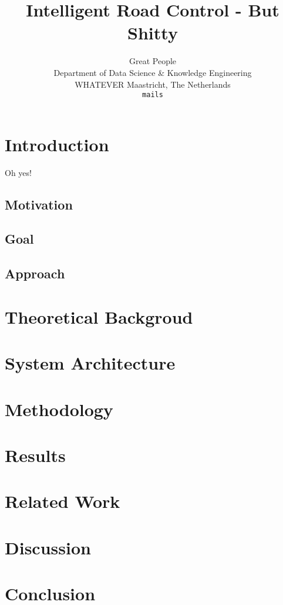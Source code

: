 \documentclass[10pt]{article}
\title{Intelligent Road Control - But Shitty}
\author{Great People \\
	Department of Data Science \& Knowledge Engineering\\
	WHATEVER Maastricht, The Netherlands\\
	{\tt mails}
  }
\begin{document}
\maketitle

\begin{abstract}
	\lipsum[1]
\end{abstract}

\section{Introduction}
Oh yes! \citep{god0000his}
\lipsum[3]

\subsection{Motivation}
\lipsum[2]

\subsection{Goal}
\lipsum[2]

\subsection{Approach}
\lipsum[2]

\section{Theoretical Backgroud}
\lipsum[2-3]
	
\section{System Architecture}
\lipsum[2-3]
	
\section{Methodology}
\lipsum[2-3]

\section{Results}
\lipsum[2-3]

\section{Related Work}
\lipsum[2-3]

\section{Discussion}
\lipsum[2-3]
	
\section{Conclusion}
\lipsum[2-3]

{\tiny\printbibliography}
\end{document}
